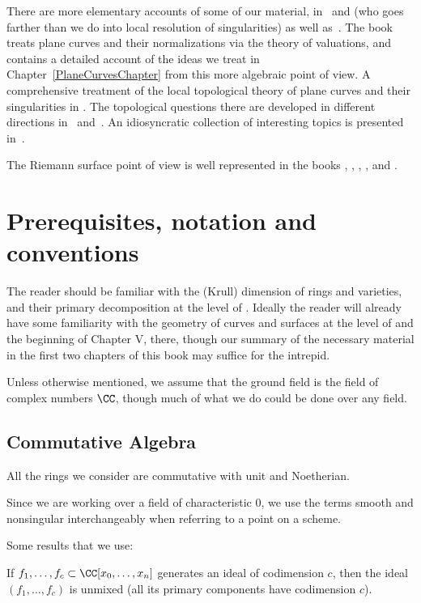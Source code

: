 There are more elementary accounts of some of our material, in~\cite{Fulton1989} and \cite{Walker1978} (who goes farther than we do into local resolution of singularities) as well as~\cite{Griffiths-curves}. The book~\cite{Kunz} treats plane curves and their normalizations via the theory of valuations, and contains a detailed  account of the ideas we treat in Chapter~\ref{PlaneCurvesChapter} from this more algebraic point of view.  A comprehensive treatment of the local topological theory of plane curves and their singularities in \cite{Brieskorn1986}. The topological questions there are developed in different directions in~\cite{MR0239612} %
 and~\cite{MR817982}. %
 An  idiosyncratic collection of interesting topics is presented in~\cite{Clemens-Scrapbook}.

 The Riemann surface point of view is well represented in the books \cite{Forster}, \cite{Gunning}, \cite{Gunning-2}, \cite{Kirwan}, and \cite{Miranda}. 


\section{Prerequisites, notation and conventions}
The reader should be familiar with the (Krull) dimension of rings and varieties, and their primary decomposition at the level of \cite{Atiyah-MacDonald}. Ideally the reader  will already have some familiarity with the geometry of curves and surfaces
at the level of \cite[Chapter IV]{Hartshorne1977} and the beginning of Chapter V, there, though our summary of the necessary material in the first two chapters of this book may suffice for the intrepid.

Unless otherwise mentioned, we assume that the ground field is the field of complex numbers $\CC$, though much of what we do
could be done over any field.

\subsection{Commutative Algebra} 
All the rings we consider are commutative with unit and Noetherian.

Since we are working over  a field of characteristic 0, we use the terms smooth and nonsingular interchangeably when
referring to a point on a scheme.

Some results that we use:
 \begin{theorem}\label{Lasker}
If $f_1,\dots, f_c \subset \CC[x_0,\dots, x_n]$ generates an ideal of codimension $c$, then 
the ideal $(f_1,\dots, f_c)$ is unmixed (all its primary components have codimension $c$).
\end{theorem}


